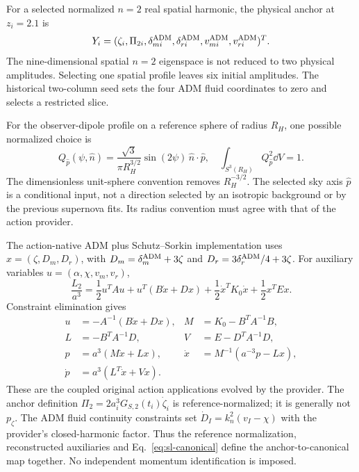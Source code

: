 For a selected normalized $n=2$ real spatial harmonic, the physical anchor
at $z_i=2.1$ is
\begin{equation}
 Y_i=(\zeta_i,\Pi_{2i},\delta^{\rm ADM}_{mi},
 \delta^{\rm ADM}_{ri},v^{\rm ADM}_{mi},v^{\rm ADM}_{ri})^T.
 \label{eq:sl-anchor}
\end{equation}
The nine-dimensional spatial $n=2$ eigenspace is not reduced to two
physical amplitudes. Selecting one spatial profile leaves six initial
amplitudes. The historical two-column seed sets the four ADM fluid
coordinates to zero and selects a restricted slice.

For the observer-dipole profile on a reference sphere of radius $R_H$,
one possible normalized choice is
\begin{equation}
 Q_{\hat p}(\psi,\hat n)=\frac{\sqrt3}{\pi R_H^{3/2}}
 \sin(2\psi)\,\hat n\!\cdot\!\hat p,
 \quad \int_{S^3(R_H)} Q_{\hat p}^2\dd V=1.
 \label{eq:sl-profile}
\end{equation}
The dimensionless unit-sphere convention removes $R_H^{-3/2}$.
The selected sky axis $\hat p$ is a conditional input, not a direction
selected by an isotropic background or by the previous supernova fits.
Its radius convention must agree with that of the action provider.

The action-native ADM plus Schutz--Sorkin implementation uses
$x=(\zeta,D_m,D_r)$, with
$D_m=\delta_m^{\rm ADM}+3\zeta$ and
$D_r=3\delta_r^{\rm ADM}/4+3\zeta$.
For auxiliary variables $u=(\alpha,\chi,v_m,v_r)$,
\begin{equation}
 \frac{L_2}{a^3}=\frac12u^TAu+u^T(B\dot x+Dx)
 +\frac12\dot x^TK_0\dot x+\frac12x^TEx.
 \label{eq:sl-action}
\end{equation}
Constraint elimination gives
\begin{align}
 u&=-A^{-1}(B\dot x+Dx),&
 M&=K_0-B^TA^{-1}B,\nonumber\\
 L&=-B^TA^{-1}D,&V&=E-D^TA^{-1}D,\nonumber\\
 p&=a^3(M\dot x+Lx),&
 \dot x&=M^{-1}(a^{-3}p-Lx),\label{eq:sl-canonical}\\
 \dot p&=a^3(L^T\dot x+Vx).\nonumber
\end{align}
These are the coupled original action applications evolved by the provider.
The anchor definition
$\Pi_2=2a_i^3G_{S,2}(t_i)\dot\zeta_i$ is reference-normalized;
it is generally not $p_\zeta$. The ADM fluid continuity constraints set
$\dot D_I=k_n^2(v_I-\chi)$ with the provider's closed-harmonic factor.
Thus the reference normalization, reconstructed auxiliaries and
Eq.~\eqref{eq:sl-canonical} define the anchor-to-canonical map together.
No independent momentum identification is imposed.

